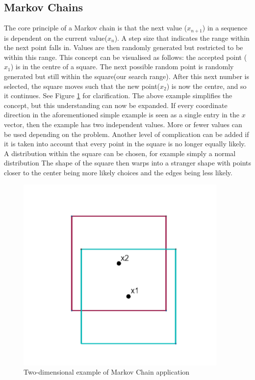 	\subsection{Markov Chains}	\label{markovexpl}
	The core principle of a Markov chain is that the next value ($x_{n+1}$) in a sequence is dependent on the current value($x_n$). 
	A step size that indicates the range within the next point falls in.
	Values are then randomly generated but restricted to be within this range.
	This concept can be visualised as follows: the accepted point ($x_1$) is in the centre of a square. The next possible random point is randomly generated but still within the square(our search range). 	
	After this next number is selected, the square moves such that the new point($x_2$) is now the centre, and so it continues.
	See Figure \ref{fig:MCsquare} for clarification.
	The above example simplifies the concept, but this understanding can now be expanded.
	If every coordinate direction in the aforementioned simple example is seen as a single entry in the $x$ vector, then the example has two independent values.
	More or fewer values can be used depending on the problem.
	Another level of complication can be added if it is taken into account that every point in the square is no longer equally likely.
	A distribution within the square can be chosen, for example simply a normal distribution
	The shape of the square then warps into a stranger shape with points closer to the center being more likely choices and the edges being less likely.
	
	\begin{figure}	
	\centering
	\includegraphics[width=0.55\linewidth]{figures/MC_squares1.png}
	\caption{Two-dimensional example of Markov Chain application}
	\label{fig:MCsquare}
	\end{figure}
	
